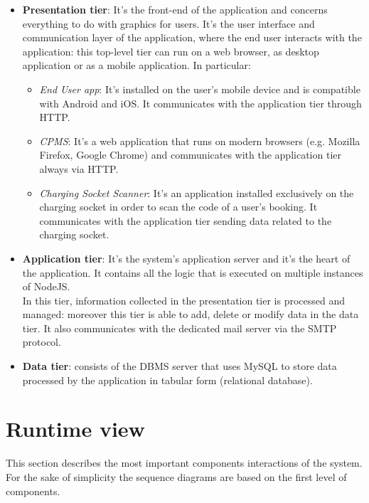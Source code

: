 \begin{itemize}
    \item \textbf{Presentation tier}: It's the front-end of the application and concerns everything to do with graphics for users. It's the user interface and communication layer of the application, where the end user interacts with the application: this top-level tier can run on a web browser, as desktop application or as a mobile application. In particular:
    \begin{itemize}
        \item \textit{End User app}: It's installed on the user's mobile device and is compatible with Android and iOS. It communicates with the application tier through HTTP.
        \item \textit{CPMS}: It's a web application that runs on modern browsers (e.g. Mozilla Firefox, Google Chrome) and communicates with the application tier always via HTTP.
        \item \textit{Charging Socket Scanner}: It's an application installed exclusively on the charging socket in order to scan the code of a user's booking. It communicates with the application tier sending data related to the charging socket.
    \end{itemize}
    \item \textbf{Application tier}: It's the system's application server and it's the heart of the application. It contains all the logic that is executed on multiple instances of NodeJS.\\
    In this tier, information collected in the presentation tier is processed and managed: moreover this tier is able to add, delete or modify data in the data tier. It also communicates with the dedicated mail server via the SMTP protocol.
    \item \textbf{Data tier}: consists of the DBMS server that uses MySQL to store data processed by the application in tabular form (relational database).  
\end{itemize}
\section{Runtime view}
This section describes the most important components interactions of the system.
For the sake of simplicity the sequence diagrams are based on the first level of components.
